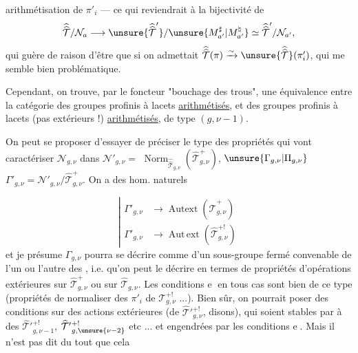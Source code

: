 
arithmétisation de $\pi'_i$ --- ce qui
reviendrait à la bijectivité de
\[
\widehat{\widehat{\mathcal T}}/\mathcal N_a
\longrightarrow
\unsure{\widehat{\widehat{\mathcal T}}'}/\unsure{M_{a'}^{\sharp}|M_{a'}^{\natural}}
\simeq \widehat{\widehat{\mathcal T}}'/\mathcal N_{a'},
\]
qui  guère de raison d'être que si
on admettait
$\widehat{\widehat{\mathcal T}}(\pi)\xrightarrow{\sim}\unsure{\widehat{\widehat{\mathcal T}}}(\pi'_i)$,
qui me semble bien problématique.

Cependant, on trouve, par le foncteur
"bouchage des trous", une équivalence
entre la catégorie des 
groupes profinis à lacets  \uline{arithmétisés},
et des groupes profinis à lacets
(pas extérieurs !) \uline{arithmétisés}, de type
$(g,\nu-1)$.

On peut se proposer d'essayer de
préciser  le type des propriétés
qui vont caractériser $\mathcal N_{g,\nu}$ dans $\mathcal N'_{g,\nu}=$
$\operatorname{Norm}_{\widehat{\widehat{\mathcal T}}_{g,\nu}}
(\widehat{\mathcal T}_{g,\nu}^{+})$,
$\unsure{\Gamma_{g,\nu}|\Pi_{g,\nu}}$
 $\Gamma'_{g,\nu}=\mathcal N'_{g,\nu}/\widehat{\mathcal T}_{g,\nu}^{+}$.
On a des hom. naturels



\[
\tag{15}
\left|
\begin{aligned}
\Gamma'_{g,\nu}&\longrightarrow\operatorname{Autext}(\widehat{\mathcal T}_{g,\nu}^{+})\\
\Gamma'_{g,\nu}&\longrightarrow\operatorname{Aut\,ext}(\widehat{\mathcal T}_{g,\nu}^{+!})
\end{aligned}
\right.
\]
et je présume  $\Gamma_{g,\nu}$ pourra
se décrire comme  d'un
sous-groupe fermé convenable de l'un
ou l'autre des  , i.e. qu'on
peut le décrire en termes de propriétés
d'opérations extérieures sur $\widehat{\mathcal T}_{g,\nu}^{+}$ ou
sur $\widehat{\mathcal T}_{g,\nu}$. Les conditions \textcircled{e} en tous
cas sont bien de ce type (propriétés
de normaliser des  
 $\pi'_i$ de $\mathcal T_{g,\nu}^{+!}$ ...).
Bien sûr, on
pourrait poser des conditions sur des
actions extérieures (de $\widehat{\mathcal T}'{}_{g,\nu}^{+!}$, disons),
qui soient stables par   à des
$\widehat{\mathcal T}'{}_{g,\nu-1}^{+!}$, $\widehat{\mathcal T}'{}_{g,\unsure{\nu-2}}^{+!}$ etc ... et
engendrées par les conditions \textcircled{e}. Mais
il n'est pas dit du tout que cela

